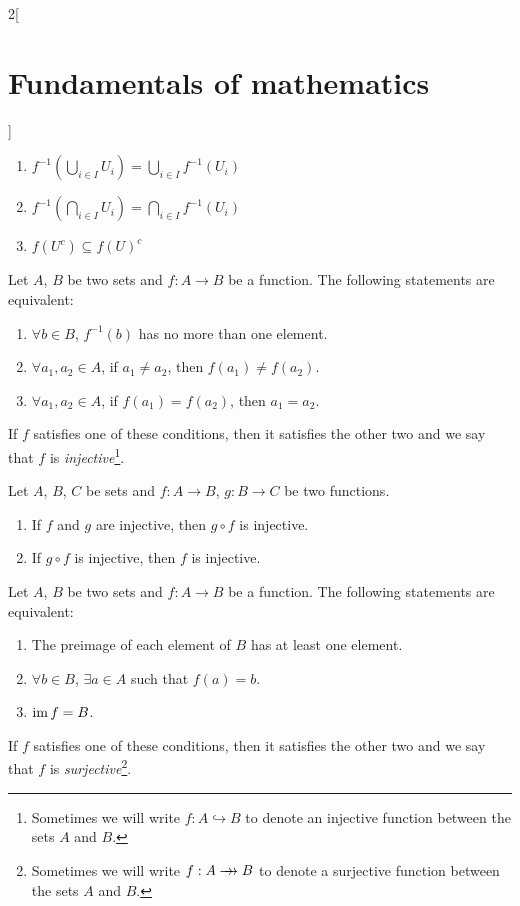 \documentclass[../../../main_math.tex]{subfiles}
\begin{document}
\begin{multicols}{2}[\section{Fundamentals of mathematics}]
\begin{proposition}
\begin{enumerate}
      \item $f^{-1}\left(\bigcup_{i\in I}U_i\right)=\bigcup_{i\in I}f^{-1}(U_i)$
      \item $f^{-1}\left(\bigcap_{i\in I}U_i\right)=\bigcap_{i\in I}f^{-1}(U_i)$
      \item $f(U^c)\subseteq f(U)^c$
    \end{enumerate}
  \end{proposition}
  \begin{definition}
    Let $A$, $B$ be two sets and $f:A\rightarrow B$ be a function. The following statements are equivalent:
    \begin{enumerate}
      \item $\forall b\in B$, $f^{-1}(b)$ has no more than one element.
      \item $\forall a_1,a_2\in A$, if $a_1\ne a_2$, then $f(a_1)\ne f(a_2)$.
      \item $\forall a_1,a_2\in A$, if $f(a_1)= f(a_2)$, then $a_1=a_2$.
    \end{enumerate}
    If $f$ satisfies one of these conditions, then it satisfies the other two and we say that $f$ is \emph{injective}\footnote{Sometimes we will write $f:A\hookrightarrow B$ to denote an injective function between the sets $A$ and $B$.}.
  \end{definition}
  \begin{proposition}
    Let $A$, $B$, $C$ be sets and $f:A\rightarrow B$, $g:B\rightarrow C$ be two functions.
    \begin{enumerate}
      \item If $f$ and $g$ are injective, then $g\circ f$ is injective.
      \item If $g\circ f$ is injective, then $f$ is injective.
    \end{enumerate}
  \end{proposition}
  \begin{definition}
    Let $A$, $B$ be two sets and $f:A\rightarrow B$ be a function. The following statements are equivalent:
    \begin{enumerate}
      \item The preimage of each element of $B$ has at least one element.
      \item $\forall b\in B$, $\exists a\in A$ such that $f(a)=b$.
      \item $\operatorname{im} f=B$.
    \end{enumerate}
    If $f$ satisfies one of these conditions, then it satisfies the other two and we say that $f$ is \emph{surjective}\footnote{Sometimes we will write $f:A\rrightarrow B$ to denote a surjective function between the sets $A$ and $B$.}.

\end{definition}
\end{multicols}
\end{document}
